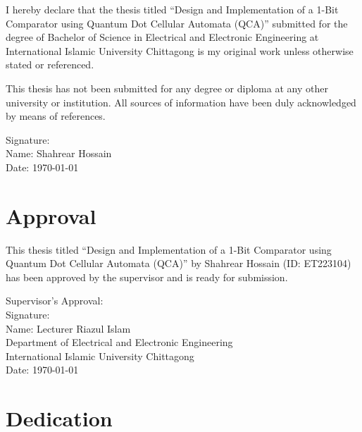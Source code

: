 \documentclass[12pt,a4paper,twoside]{report}
\begin{document}
I hereby declare that the thesis titled ``Design and Implementation of a 1-Bit Comparator using Quantum Dot Cellular Automata (QCA)'' submitted for the degree of Bachelor of Science in Electrical and Electronic Engineering at International Islamic University Chittagong is my original work unless otherwise stated or referenced.

This thesis has not been submitted for any degree or diploma at any other university or institution. All sources of information have been duly acknowledged by means of references.

\vspace{2cm}

\noindent Signature: \hrulefill\\
\noindent Name: Shahrear Hossain\\
\noindent Date: \today

\chapter*{Approval}

This thesis titled ``Design and Implementation of a 1-Bit Comparator using Quantum Dot Cellular Automata (QCA)'' by Shahrear Hossain (ID: ET223104) has been approved by the supervisor and is ready for submission.

\vspace{2cm}

\noindent Supervisor's Approval:\\
\vspace{1cm}
\noindent Signature: \hrulefill\\
\noindent Name: Lecturer Riazul Islam\\
\noindent Department of Electrical and Electronic Engineering\\
\noindent International Islamic University Chittagong\\
\noindent Date: \today

\chapter*{Dedication}
\end{document}
